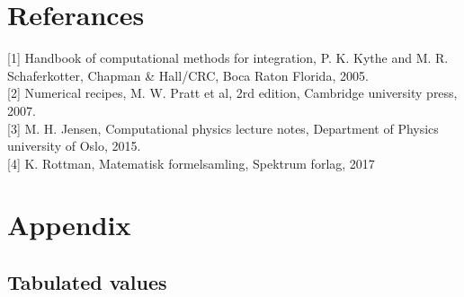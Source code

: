 \documentclass[%
reprint,nofootinbib,
amsmath,amssymb,
aps,
]{revtex4-1}
\begin{document}
\section{Referances}
[1] Handbook of computational methods for integration, P. K. Kythe and M. R. Schaferkotter, Chapman \& Hall/CRC, Boca Raton Florida, 2005.\\

[2] Numerical recipes, M. W. Pratt et al, 2rd edition, Cambridge university press, 2007.\\  

[3] M. H. Jensen, Computational physics lecture notes, Department of Physics university of Oslo, 2015. \\

[4] K. Rottman, Matematisk formelsamling, Spektrum forlag, 2017 \\


\newpage 
\section{Appendix}
\subsection{Tabulated values}
\end{document}
